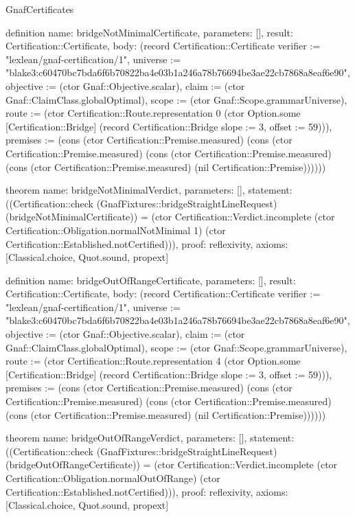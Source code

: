 \begin{lexlean}{GnafCertificates}
\begin{semanticmodule}
definition{
  name: bridgeNotMinimalCertificate,
  parameters: [],
  result: Certification::Certificate,
  body: (record Certification::Certificate {verifier := "lexlean/gnaf-certification/1", universe := "blake3:c60470bc7bda6f6b70822ba4e03b1a246a78b76694be3ae22cb7868a8eaf6e90", objective := (ctor Gnaf::Objective.scalar), claim := (ctor Gnaf::ClaimClass.globalOptimal), scope := (ctor Gnaf::Scope.grammarUniverse), route := (ctor Certification::Route.representation 0 (ctor Option.some [Certification::Bridge] (record Certification::Bridge {slope := 3, offset := 59}))), premises := (cons (ctor Certification::Premise.measured) (cons (ctor Certification::Premise.measured) (cons (ctor Certification::Premise.measured) (cons (ctor Certification::Premise.measured) (nil Certification::Premise)))))})
}

theorem{
  name: bridgeNotMinimalVerdict,
  parameters: [],
  statement: ((Certification::check (GnafFixtures::bridgeStraightLineRequest) (bridgeNotMinimalCertificate)) = (ctor Certification::Verdict.incomplete (ctor Certification::Obligation.normalNotMinimal 1) (ctor Certification::Established.notCertified))),
  proof: reflexivity{},
  axioms: [Classical.choice, Quot.sound, propext]
}

definition{
  name: bridgeOutOfRangeCertificate,
  parameters: [],
  result: Certification::Certificate,
  body: (record Certification::Certificate {verifier := "lexlean/gnaf-certification/1", universe := "blake3:c60470bc7bda6f6b70822ba4e03b1a246a78b76694be3ae22cb7868a8eaf6e90", objective := (ctor Gnaf::Objective.scalar), claim := (ctor Gnaf::ClaimClass.globalOptimal), scope := (ctor Gnaf::Scope.grammarUniverse), route := (ctor Certification::Route.representation 4 (ctor Option.some [Certification::Bridge] (record Certification::Bridge {slope := 3, offset := 59}))), premises := (cons (ctor Certification::Premise.measured) (cons (ctor Certification::Premise.measured) (cons (ctor Certification::Premise.measured) (cons (ctor Certification::Premise.measured) (nil Certification::Premise)))))})
}

theorem{
  name: bridgeOutOfRangeVerdict,
  parameters: [],
  statement: ((Certification::check (GnafFixtures::bridgeStraightLineRequest) (bridgeOutOfRangeCertificate)) = (ctor Certification::Verdict.incomplete (ctor Certification::Obligation.normalOutOfRange) (ctor Certification::Established.notCertified))),
  proof: reflexivity{},
  axioms: [Classical.choice, Quot.sound, propext]
}


\end{semanticmodule}
\end{lexlean}
